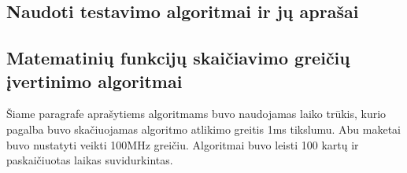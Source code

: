 \documentclass[a4paper, 12pt]{article} %
\begin{document}
\begin{onehalfspacing}
\newpage %

\section{Naudoti testavimo algoritmai ir j\k{u} apra\v{s}ai}
\subsection{Matematini\k{u} funkcij\k{u} skai\v{c}iavimo grei\v{c}i\k{u} \k{i}vertinimo algoritmai}
\v{S}iame paragrafe apra\v{s}ytiems algoritmams buvo naudojamas laiko tr\=ukis, kurio pagalba buvo ska\v{c}iuojamas algoritmo atlikimo greitis 1ms tikslumu. Abu maketai buvo nustatyti veikti 100MHz grei\v{c}iu. Algoritmai buvo leisti 100 kart\k{u} ir paskai\v{c}iuotas laikas suvidurkintas.

\end{onehalfspacing}
\end{document}
